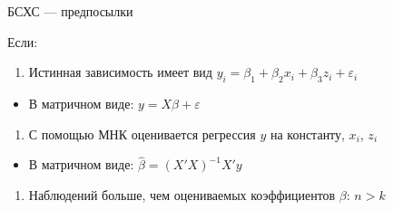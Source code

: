 \documentclass[ignorenonframetext,]{beamer}
\begin{document}
\begin{frame}{БСХС --- предпосылки}

Если:

\begin{enumerate}
\def\labelenumi{\arabic{enumi}.}
\itemsep1pt\parskip0pt
\item
  Истинная зависимость имеет вид
  $y_i=\beta_1 + \beta_2 x_i + \beta_3 z_i+\varepsilon_i$
\end{enumerate}

\begin{itemize}
\itemsep1pt\parskip0pt
\item
  В матричном виде: $y=X\beta + \varepsilon$
\end{itemize}

\begin{enumerate}
\def\labelenumi{\arabic{enumi}.}
\setcounter{enumi}{1}
\itemsep1pt\parskip0pt
\item
  С помощью МНК оценивается регрессия $y$ на константу, $x_i$, $z_i$
\end{enumerate}

\begin{itemize}
\itemsep1pt\parskip0pt
\item
  В матричном виде: $\hat{\beta}=(X'X)^{-1}X'y$
\end{itemize}

\begin{enumerate}
\def\labelenumi{\arabic{enumi}.}
\setcounter{enumi}{2}
\itemsep1pt\parskip0pt
\item
  Наблюдений больше, чем оцениваемых коэффициентов $\beta$: $n>k$
\end{enumerate}

\end{frame}
\end{document}
